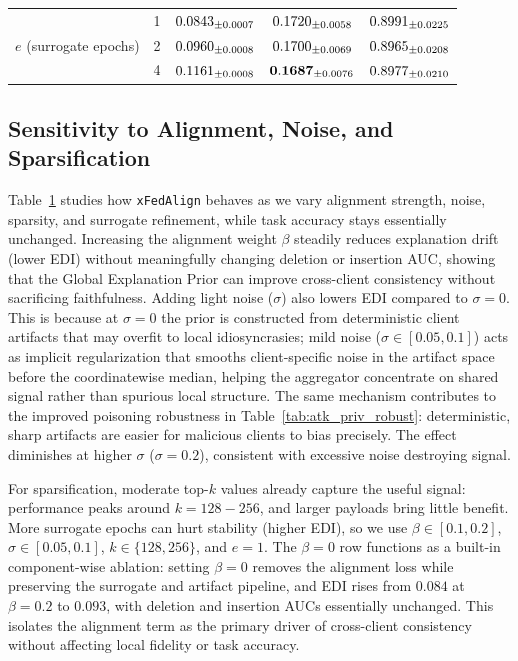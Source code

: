 \documentclass{article}
\newcommand{\meanstd}[2]{#1\textsubscript{\scriptsize$\pm$#2}}
\theoremstyle{plain}
\theoremstyle{definition}
\theoremstyle{remark}
\begin{document}
\begin{table}[t]
{\begin{tabular}{c c c c c}
\multirow{3}{*}{$e$ (surrogate epochs)}
 & 1 & $\meanstd{0.0843}{0.0007}$ & $\meanstd{0.1720}{0.0058}$ & $\meanstd{0.8991}{0.0225}$ \\
 & 2 & $\meanstd{0.0960}{0.0008}$ & $\meanstd{0.1700}{0.0069}$ & $\meanstd{0.8965}{0.0208}$ \\
 & 4 & $\meanstd{0.1161}{0.0008}$ & $\mathbf{\meanstd{0.1687}{0.0076}}$ & $\meanstd{0.8977}{0.0210}$ \\
\bottomrule
\end{tabular}
}
\label{tab:ablation-no-acc}
\end{table}

\subsection{Sensitivity to Alignment, Noise, and Sparsification}

Table~\ref{tab:ablation-no-acc} studies how \texttt{xFedAlign} behaves as we vary alignment strength, noise, sparsity, and surrogate refinement, while task accuracy stays essentially unchanged. Increasing the alignment weight \(\beta\) steadily reduces explanation drift (lower EDI) without meaningfully changing deletion or insertion AUC, showing that the Global Explanation Prior can improve cross-client consistency without sacrificing faithfulness. Adding light noise ($\sigma$) also lowers EDI compared to $\sigma{=}0$. This is because at $\sigma{=}0$ the prior is constructed from deterministic client artifacts that may overfit to local idiosyncrasies; mild noise ($\sigma\in[0.05,0.1]$) acts as implicit regularization that smooths client-specific noise in the artifact space before the coordinatewise median, helping the aggregator concentrate on shared signal rather than spurious local structure. The same mechanism contributes to the improved poisoning robustness in Table~\ref{tab:atk_priv_robust}: deterministic, sharp artifacts are easier for malicious clients to bias precisely. The effect diminishes at higher $\sigma$ ($\sigma{=}0.2$), consistent with excessive noise destroying signal.

For sparsification, moderate top-$k$ values already capture the useful signal: performance peaks around \(k{=}128\!-\!256\), and larger payloads bring little benefit. More surrogate epochs can hurt stability (higher EDI), so we use \(\beta\in[0.1,0.2]\), \(\sigma\in[0.05,0.1]\), \(k\in\{128,256\}\), and \(e{=}1\). The $\beta=0$ row functions as a built-in component-wise ablation: setting $\beta=0$ removes the alignment loss while preserving the surrogate and artifact pipeline, and EDI rises from $0.084$ at $\beta=0.2$ to $0.093$, with deletion and insertion AUCs essentially unchanged. This isolates the alignment term as the primary driver of cross-client consistency without affecting local fidelity or task accuracy.
\end{document}
